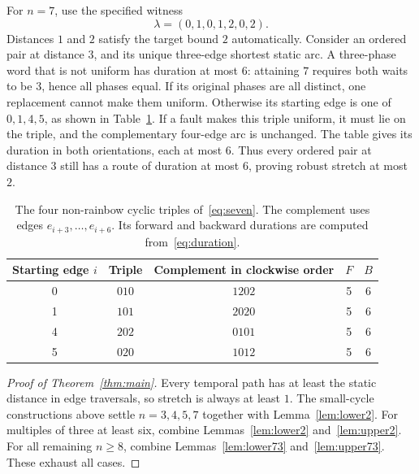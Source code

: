 \documentclass[11pt,a4paper]{article}
\begin{document}
For $n=7$, use the specified witness
\begin{equation}
 \lambda=(0,1,0,1,2,0,2).\label{eq:seven}
\end{equation}
Distances $1$ and $2$ satisfy the target bound $2$ automatically. Consider an ordered pair at distance $3$, and its unique three-edge shortest static arc. A three-phase word that is not uniform has duration at most $6$: attaining $7$ requires both waits to be $3$, hence all phases equal. If its original phases are all distinct, one replacement cannot make them uniform. Otherwise its starting edge is one of $0,1,4,5$, as shown in Table~\ref{tab:seven}. If a fault makes this triple uniform, it must lie on the triple, and the complementary four-edge arc is unchanged. The table gives its duration in both orientations, each at most $6$. Thus every ordered pair at distance $3$ still has a route of duration at most $6$, proving robust stretch at most $2$.

\begin{table}[ht]
\centering
\begin{tabular}{ccccc}
\toprule
Starting edge $i$ & Triple & Complement in clockwise order & $F$ & $B$\\
\midrule
0 & $010$ & $1202$ & 5 & 6\\
1 & $101$ & $2020$ & 5 & 6\\
4 & $202$ & $0101$ & 5 & 6\\
5 & $020$ & $1012$ & 5 & 6\\
\bottomrule
\end{tabular}
\caption{The four non-rainbow cyclic triples of~\eqref{eq:seven}. The complement uses edges $e_{i+3},\ldots,e_{i+6}$. Its forward and backward durations are computed from~\eqref{eq:duration}.}\label{tab:seven}
\end{table}

\begin{proof}[Proof of Theorem~\ref{thm:main}]
Every temporal path has at least the static distance in edge traversals, so stretch is always at least $1$. The small-cycle constructions above settle $n=3,4,5,7$ together with Lemma~\ref{lem:lower2}. For multiples of three at least six, combine Lemmas~\ref{lem:lower2} and~\ref{lem:upper2}. For all remaining $n\ge8$, combine Lemmas~\ref{lem:lower73} and~\ref{lem:upper73}. These exhaust all cases.
\end{proof}
\end{document}
